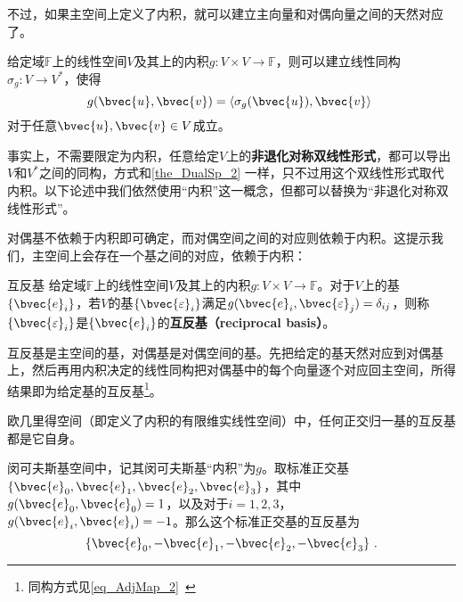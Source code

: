 不过，如果主空间上定义了内积，就可以建立主向量和对偶向量之间的天然对应了。

\begin{theorem}{}\label{the_DualSp_2}
给定域$\mathbb{F}$上的线性空间$V$及其上的内积$g:V\times V\to \mathbb{F}$，则可以建立线性同构$\sigma_g: V\to V^*$，使得
\begin{equation}
g(\bvec{u}, \bvec{v}) = \langle \sigma_g(\bvec{u}) , \bvec{v} \rangle~
\end{equation}
对于任意$\bvec{u}, \bvec{v}\in V$成立。

\end{theorem}

事实上，不需要限定为内积，任意给定$V$上的\textbf{非退化对称双线性形式}，都可以导出$V$和$V^*$之间的同构，方式和\autoref{the_DualSp_2} 一样，只不过用这个双线性形式取代内积。以下论述中我们依然使用“内积”这一概念，但都可以替换为“非退化对称双线性形式”。

对偶基不依赖于内积即可确定，而对偶空间之间的对应则依赖于内积。这提示我们，主空间上会存在一个基之间的对应，依赖于内积：

\begin{definition}{互反基}
给定域$\mathbb{F}$上的线性空间$V$及其上的内积$g:V\times V\to \mathbb{F}$。对于$V$上的基$\{\bvec{e}_i\}$，若$V$的基$\{\bvec{\varepsilon}_i\}$满足$g(\bvec{e}_i, \bvec{\varepsilon}_j)=\delta_{ij}$，则称$\{\bvec{\varepsilon}_i\}$是$\{\bvec{e}_i\}$的\textbf{互反基（reciprocal basis）}。

\end{definition}

互反基是主空间的基，对偶基是对偶空间的基。先把给定的基天然对应到对偶基上，然后再用内积决定的线性同构把对偶基中的每个向量逐个对应回主空间，所得结果即为给定基的互反基\footnote{同构方式见\autoref{eq_AdjMap_2}~}。

\begin{example}{}
欧几里得空间（即定义了内积的有限维实线性空间）中，任何正交归一基的互反基都是它自身。

闵可夫斯基空间中，记其闵可夫斯基“内积”为$g$。取标准正交基$\{\bvec{e}_0, \bvec{e}_1, \bvec{e}_2, \bvec{e}_3\}$，其中$g(\bvec{e}_0, \bvec{e}_0)=1$，以及对于$i=1, 2, 3$，$g(\bvec{e}_i, \bvec{e}_i)=-1$。那么这个标准正交基的互反基为
\begin{equation}
\{\bvec{e}_0, -\bvec{e}_1, -\bvec{e}_2, -\bvec{e}_3\}~. 
\end{equation}

\end{example}


